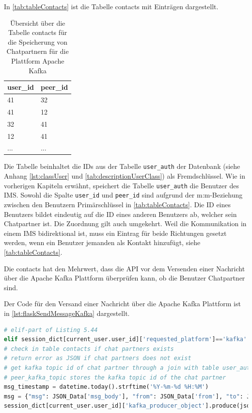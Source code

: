 \documentclass[a4paper,titlepage,halfparskip,12pt]{scrreprt}
\begin{document}
\begin{onehalfspacing}
In \autoref{tab:tableContacts} ist die Tabelle contacts mit Einträgen dargestellt.

\begin{table}[h]
\centering
\caption{Übersicht über die Tabelle contacts für die Speicherung von Chatpartnern für die Plattform Apache Kafka}
\begin{tabular}{|l|l|}
\hline
\textbf{user\_id} &  \textbf{peer\_id} \\
\hline
41 & 32 \\
\hline
41 & 12 \\
\hline
32 & 41 \\
\hline
12 & 41 \\
\hline
... & ... \\
\hline
\end{tabular}
\label{tab:tableContacts}
\end{table}

Die Tabelle beinhaltet die IDs aus der Tabelle \texttt{user\_auth} der Datenbank (siehe Anhang \autoref{lst:classUser} und \autoref{tab:descriptionUserClass}) als Fremdschlüssel. Wie in vorherigen Kapiteln erwähnt, speichert die Tabelle \texttt{user\_auth} die Benutzer des \acs{IMS}. Sowohl die Spalte \texttt{user\_id} und \texttt{peer\_id} sind aufgrund der m:m-Beziehung zwischen den Benutzern Primärschlüssel in \autoref{tab:tableContacts}. Die ID eines Benutzers bildet eindeutig auf die ID eines anderen Benutzers ab, welcher sein Chatpartner ist. Die Zuordnung gilt auch umgekehrt. Weil die Kommunikation in einem \acs{IMS} bidirektional ist, muss ein Eintrag für beide Richtungen gesetzt werden, wenn ein Benutzer jemanden als Kontakt hinzufügt, siehe \autoref{tab:tableContacts}.

Die contacts hat den Mehrwert, dass die \acs{API} vor dem Versenden einer Nachricht über die Apache Kafka Plattform überprüfen kann, ob die Benutzer Chatpartner sind.

Der Code für den Versand einer Nachricht über die Apache Kafka Plattform ist in \autoref{lst:flaskSendMessageKafka} dargestellt.

\begin{lstlisting}[language=python, caption={Code für den Versand einer Nachricht über die \acs{API} an Apache Kafka}, label={lst:flaskSendMessageKafka}]
# elif-part of Listing 5.44
elif session_dict[current_user.user_id]['requested_platform']=='kafka':
# check in table contacts if chat partners exists
# return error as JSON if chat partners does not exist
# get kafka topic id of chat partner through a join with table user_auth
# peer_kafka_topic stores the kafka topic id of the chat partner
msg_timestamp = datetime.today().strftime('%Y-%m-%d %H:%M')
msg = {"msg": JSON_Data['msg_body'], "from": JSON_Data['from'], "to": JSON_Data['to'], "timestamp": msg_timestamp, "type": "chat"}
session_dict[current_user.user_id]['kafka_producer_object'].produce(json.dumps(msg).encode())


\end{lstlisting}
\end{onehalfspacing}
\end{document}
